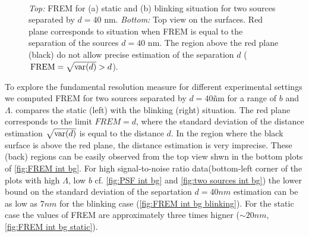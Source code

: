 \begin{figure}[!hbt]
	\centering
	\newcommand{\wf}{.48\textwidth}
	\\
	\caption{{\it Top:} FREM for (a) static and (b) blinking situation for two sources separated by $d=40$ nm. {\it Bottom:} Top view on the surfaces. Red plane corresponds to situation when FREM is equal to the separation of the sources $d=40$ nm. The region above the red plane (black) do not allow precise estimation of the separation $d$ ($\, \mathrm{FREM}=\sqrt{\mathrm{var}(d)}>d$).}
	\label{fig:FREM int bg}
\end{figure}

To explore the fundamental resolution measure for different experimental settings we computed FREM for two sources separated by $d=40$\~nm for a range of $b$ and $\Lambda$.  compares the static (left) with the blinking (right) situation. The red plane corresponds to the limit $\unit{FREM}=d$, where the standard deviation of the distance estimation $\sqrt{\mathrm{var}(d)}$ is equal to the distance $d$. In the region where the black surface is above the red plane, the distance estimation is very imprecise. These (back) regions can be easily observed from the top view shwn in the bottom plots of \autoref{fig:FREM int bg}. For high signal-to-noise ratio data(bottom-left corner of the plots with high $\Lambda$, low $b$ cf. \autoref{fig:PSF int bg} and \ref{fig:two sources int bg}) the lower bound on the standard deviation of the separtation $d=40\unit{nm}$ estimation can be as low as $7\unit{nm}$ for the blinking case (\autoref{fig:FREM int bg blinking}). For the static case the values of FREM are approximately three times higner ($\sim 20\unit{nm}$,  \autoref{fig:FREM int bg static}).

